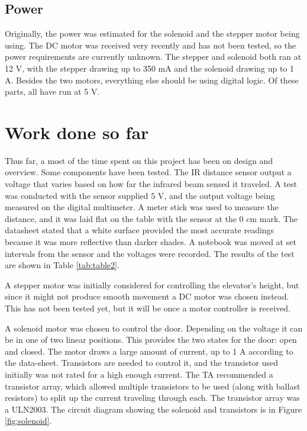 \documentclass{article}
\begin{document}
	    \subsection{Power}
	    Originally, the power was estimated for the solenoid and the stepper motor being using. The DC motor was received very recently and has not been tested, so the power requirements are currently unknown. The stepper and solenoid both ran at 12 V, with the stepper drawing up to 350 mA and the solenoid drawing up to 1 A. Besides the two motors, everything else should be using digital logic. Of these parts, all have run at 5 V.

	\section{Work done so far}
	Thus far, a most of the time spent on this project has been on design and overview. Some components have been tested. The IR distance sensor output a voltage that varies based on how far the infrared beam sensed it traveled. A test was conducted with the sensor supplied 5 V, and the output voltage being measured on the digital multimeter. A meter stick was used to measure the distance, and it was laid flat on the table with the sensor at the 0 cm mark. The datasheet\cite{project_overview:IR_datasheet} stated that a white surface provided the most accurate readings because it was more reflective than darker shades. A notebook was moved at set intervals from the sensor and the voltages were recorded. The results of the test are shown in Table \ref{tab:table2}.
	
    A stepper motor was initially considered for controlling the elevator's height, but since it might not produce smooth movement a DC motor was chosen instead. This has not been tested yet, but it will be once a motor controller is received.
    
    A solenoid motor\cite{project_overview:solenoid_datasheet} was chosen to control the door. Depending on the voltage it can be in one of two linear positions. This provides the two states for the door: open and closed. The motor draws a large amount of current, up to 1 A according to the data-sheet. Transistors are needed to control it, and the transistor used initially was not rated for a high enough current. The TA recommended a transistor array, which allowed multiple transistors to be used (along with ballast resistors) to split up the current traveling through each. The transistor array was a ULN2003\cite{project_overview:uln2003_datasheet}. The circuit diagram showing the solenoid and transistors is in Figure \ref{fig:solenoid}.
    
\end{document}
